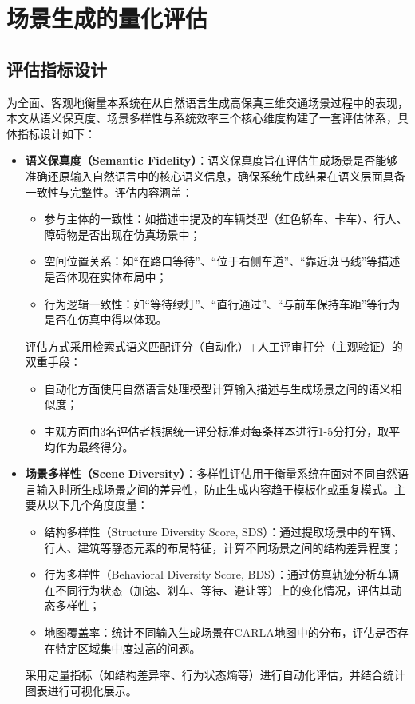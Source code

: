 \chapter{场景生成的量化评估}

\section{评估指标设计}
为全面、客观地衡量本系统在从自然语言生成高保真三维交通场景过程中的表现，本文从语义保真度、场景多样性与系统效率三个核心维度构建了一套评估体系，具体指标设计如下：

\begin{itemize}
	\item \textbf{语义保真度（Semantic Fidelity）}：语义保真度旨在评估生成场景是否能够准确还原输入自然语言中的核心语义信息，确保系统生成结果在语义层面具备一致性与完整性。评估内容涵盖：
	\begin{itemize}
		\item 参与主体的一致性：如描述中提及的车辆类型（红色轿车、卡车）、行人、障碍物是否出现在仿真场景中；
		\item 空间位置关系：如“在路口等待”、“位于右侧车道”、“靠近斑马线”等描述是否体现在实体布局中；
		\item 行为逻辑一致性：如“等待绿灯”、“直行通过”、“与前车保持车距”等行为是否在仿真中得以体现。
	\end{itemize}
	评估方式采用检索式语义匹配评分（自动化）+人工评审打分（主观验证）的双重手段：
	\begin{itemize}
		\item 自动化方面使用自然语言处理模型计算输入描述与生成场景之间的语义相似度；
		\item 主观方面由3名评估者根据统一评分标准对每条样本进行1-5分打分，取平均作为最终得分。
	\end{itemize}
	
	\item \textbf{场景多样性（Scene Diversity）}：多样性评估用于衡量系统在面对不同自然语言输入时所生成场景之间的差异性，防止生成内容趋于模板化或重复模式。主要从以下几个角度度量：
	\begin{itemize}
		\item 结构多样性（Structure Diversity Score, SDS）：通过提取场景中的车辆、行人、建筑等静态元素的布局特征，计算不同场景之间的结构差异程度；
		\item 行为多样性（Behavioral Diversity Score, BDS）：通过仿真轨迹分析车辆在不同行为状态（加速、刹车、等待、避让等）上的变化情况，评估其动态多样性；
		\item 地图覆盖率：统计不同输入生成场景在CARLA地图中的分布，评估是否存在特定区域集中度过高的问题。
	\end{itemize}
	采用定量指标（如结构差异率、行为状态熵等）进行自动化评估，并结合统计图表进行可视化展示。
	

\end{itemize}
